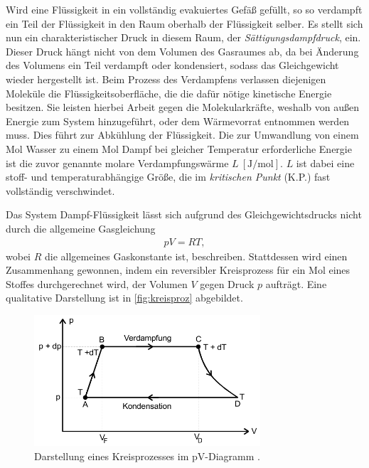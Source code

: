 \noindent
Wird eine Flüssigkeit in ein vollständig evakuiertes Gefäß gefüllt, so so verdampft ein Teil der Flüssigkeit in den Raum oberhalb der Flüssigkeit
selber. Es stellt sich nun ein charakteristischer Druck in diesem Raum, der \textit{Sättigungsdampfdruck}, ein.
Dieser Druck hängt nicht von dem Volumen des Gasraumes ab, da bei Änderung des Volumens ein Teil verdampft oder kondensiert, sodass das
Gleichgewicht wieder hergestellt ist.
Beim Prozess des Verdampfens verlassen diejenigen Moleküle die Flüssigkeitsoberfläche, die die dafür nötige kinetische Energie besitzen.
Sie leisten hierbei Arbeit gegen die Molekularkräfte, weshalb von außen Energie zum System hinzugeführt, oder dem Wärmevorrat entnommen werden
muss. Dies führt zur Abkühlung der Flüssigkeit. Die zur Umwandlung von einem Mol Wasser zu einem Mol Dampf bei gleicher Temperatur 
erforderliche Energie ist die zuvor genannte molare Verdampfungswärme $L \: [\si{\joule\per\mol}]$.
$L$ ist dabei eine stoff- und temperaturabhängige Größe, die im \textit{kritischen Punkt} (K.P.) fast vollständig verschwindet.



\noindent
Das System Dampf-Flüssigkeit lässt sich aufgrund des Gleichgewichtsdrucks nicht durch die allgemeine Gasgleichung 
\begin{align}
    \label{eqn:gasgl}
    pV = RT,
\end{align}
wobei $R$ die allgemeines Gaskonstante ist, beschreiben. Stattdessen wird einen Zusammenhang gewonnen, indem ein reversibler Kreisprozess
für ein Mol eines Stoffes durchgerechnet wird, der Volumen $V$ gegen Druck $p$ aufträgt. 
Eine qualitative Darstellung ist in \autoref{fig:kreisproz} abgebildet.

\begin{figure}[H]
    \centering
    \includegraphics[width=0.75\textwidth]{daten/Dampfdruckkurve.png}
    \caption{Darstellung eines Kreisprozesses im pV-Diagramm \cite{anleitung}.}
    \label{fig:kreisproz}
\end{figure}

